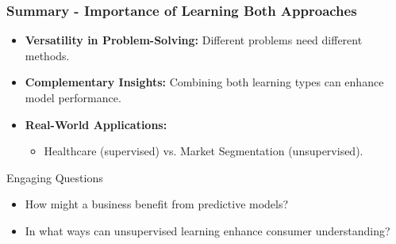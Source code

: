 \documentclass[aspectratio=169]{beamer}
\begin{document}
\begin{frame}[fragile]
  \frametitle{Summary - Importance of Learning Both Approaches}
  \begin{itemize}
    \item \textbf{Versatility in Problem-Solving:} Different problems need different methods.
    \item \textbf{Complementary Insights:} Combining both learning types can enhance model performance.
    \item \textbf{Real-World Applications:}
    \begin{itemize}
      \item Healthcare (supervised) vs. Market Segmentation (unsupervised).
    \end{itemize}
  \end{itemize}

  \begin{block}{Engaging Questions}
    \begin{itemize}
      \item How might a business benefit from predictive models?
      \item In what ways can unsupervised learning enhance consumer understanding?
    \end{itemize}
  \end{block}
\end{frame}
\end{document}
